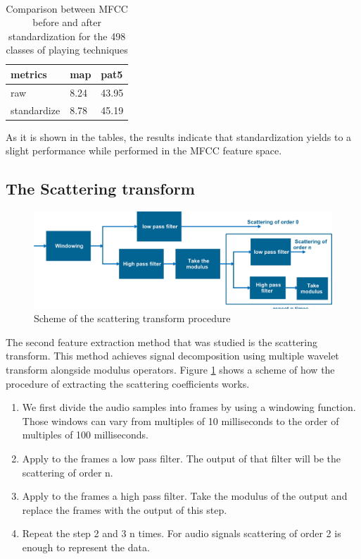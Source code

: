 \documentclass[hidelinks,12pt]{report}
\begin{document}
\begin{table}[H]
\begin{center} 
\ 
 \setlength{\tabcolsep}{.16667em} 
\begin{tabular}{|l|l|l|} 
metrics & map & pat5  \\ 
\hline 
raw & 8.24 & 43.95  \\ 
standardize & 8.78 & 45.19  \\ 

\end{tabular} 
\end{center} 
\caption{Comparison between MFCC before and after standardization for the 498 classes of playing techniques} 
\label{me} 
\end{table}
As it is shown in the tables, the results indicate that standardization yields to a slight performance while performed in the MFCC feature space.
\subsection{The Scattering transform}
\begin{figure}[t!]
  
  \centering
	    \includegraphics[width=1\textwidth]{scattering}
    \caption{Scheme of the scattering transform procedure }
    \label{scat}
\end{figure}
The second feature extraction method that was studied is the scattering transform. This method achieves signal decomposition using multiple wavelet transform alongside modulus operators. Figure \ref{scat} shows a scheme of how the procedure of extracting the scattering coefficients works. 


\begin{enumerate}
\item We first divide the audio samples into frames by using a windowing function. Those windows can vary from multiples of 10 milliseconds to the order of multiples of 100 milliseconds.  
\item Apply to the frames a low pass filter. The output of that filter will be the scattering of order n.
\item Apply to the frames a high pass filter. Take the modulus of the output and replace the frames with the output of this step.
\item Repeat the step 2 and 3 n times. For audio signals scattering of order 2 is enough to represent the data.
\end{enumerate}
\end{document}
